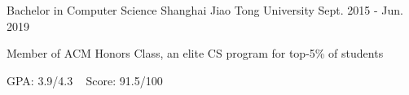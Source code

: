 

\begin{cventries}

  \cventry
    {Bachelor in Computer Science} %
    {Shanghai Jiao Tong University} %
    {Sept. 2015 - Jun. 2019} %
    {} %
    {
    \begin{cvitems} %
    	\item {Member of ACM Honors Class, an elite CS program for top-5\% of students}
    	\item {GPA: 3.9/4.3 ~ Score: 91.5/100}
    \end{cvitems}
    }

\end{cventries}
